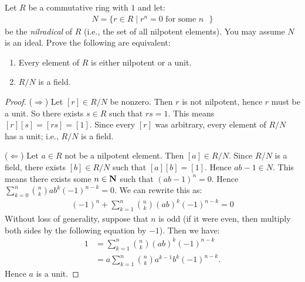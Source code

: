 \documentclass[11pt,twoside,openany]{memoir}
\begin{document}
\begin{problem}[S12, P4]
Let $R$ be a commutative ring with $1$ and let:
    \begin{equation*}
    \begin{split}
        N = \{r \in R \mid r^n = 0 \text{ for some $n$ }\}
    \end{split}
    \end{equation*}
be the \textit{nilradical} of $R$ (i.e., the set of all nilpotent elements). You may assume $N$ is an ideal. Prove the following are equivalent:
    \begin{enumerate}[label = (\arabic*),itemsep=1pt,topsep=3pt]
        \item Every element of $R$ is either nilpotent or a unit.
        \item $R/N$ is a field.
    \end{enumerate}
\end{problem}
    {\color{blue} \begin{proof}
        ($\Rightarrow$) Let $[r] \in R/N$ be nonzero. Then $r$ is not nilpotent, hence $r$ must be a unit. So there exists $s \in R$ such that $rs = 1$. This means $[r][s] = [rs] = [1]$. Since every $[r]$ was arbitrary, every element of $R/N$ has a unit; i.e., $R/N$ is a field.

        ($\Leftarrow$) Let $a \in R$ not be a nilpotent element. Then $[a] \in R/N$. Since $R/N$ is a field, there exists $[b] \in R/N$ such that $[a][b]=[1]$. Hence $ab - 1 \in N$. This means there exists some $n \in \mathbf{N}$ such that $(ab-1)^n = 0$. Hence $\sum_{k=0}^n {n \choose k}ab^{k}(-1)^{n-k} = 0$. We can rewrite this as:
            \begin{equation*}
            \begin{split}
                (-1)^n + \sum_{k = 1}^n {n \choose k}(ab)^{k}(-1)^{n-k} = 0
            \end{split}
            \end{equation*} 
        Without loss of generality, suppose that $n$ is odd (if it were even, then multiply both sides by the following equation by $-1$). Then we have:
            \begin{equation*}
            \begin{split}
                1
                &=\sum_{k = 1}^n {n \choose k}(ab)^{k}(-1)^{n-k} \\
                & = a \sum_{k = 1}^n {n \choose k}a^{k-1}b^k (-1)^{n-k}.
            \end{split}
            \end{equation*} 
        Hence $a$ is a unit.
    \end{proof}}
\end{document}
